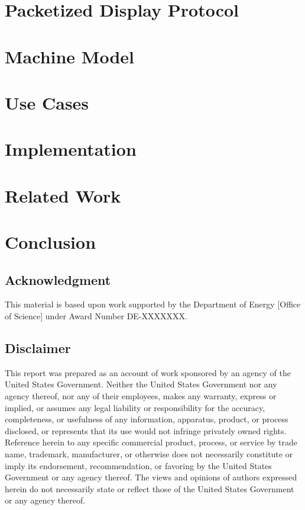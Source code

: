 \documentclass{udthesis}
\begin{document}
    \chapter{Packetized Display Protocol}
        
    \chapter{Machine Model}
        
    \chapter{Use Cases}
        
    \chapter{Implementation}
        
    \chapter{Related Work}
        
    \chapter*{Conclusion}
        

    \section*{Acknowledgment}
        This material is based upon work supported by the Department of Energy [Office of Science] under Award Number DE-XXXXXXX.

    \section*{Disclaimer}
        This report was prepared as an account of work sponsored by an agency of the United States Government. Neither the United States Government nor any agency thereof, nor any of their employees, makes any warranty, express or implied, or assumes any legal liability or responsibility for the accuracy, completeness, or usefulness of any information, apparatus, product, or process disclosed, or represents that its use would not infringe privately owned rights. Reference herein to any specific commercial product, process, or service by trade name, trademark, manufacturer, or otherwise does not necessarily constitute or imply its endorsement, recommendation, or favoring by the United States Government or any agency thereof. The views and opinions of authors expressed herein do not necessarily state or reflect those of the United States Government or any agency thereof.

   
   
\end{document}
